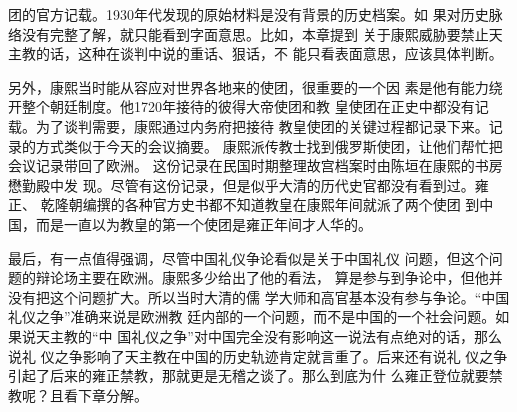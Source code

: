 团的官方记载。1930年代发现的原始材料是没有背景的历史档案。如%
果对历史脉络没有完整了解，就只能看到字面意思。比如，本章提到%
关于康熙威胁要禁止天主教的话，这种在谈判中说的重话、狠话，不%
能只看表面意思，应该具体判断。%
\par
另外，康熙当时能从容应对世界各地来的使团，很重要的一个因%
素是他有能力绕开整个朝廷制度。他1720年接待的彼得大帝使团和教%
皇使团在正史中都没有记载。为了谈判需要，康熙通过内务府把接待%
教皇使团的关键过程都记录下来。记录的方式类似于今天的会议摘要。%
康熙派传教士找到俄罗斯使团，让他们帮忙把会议记录带回了欧洲。%
这份记录在民国时期整理故宫档案时由陈垣在康熙的书房懋勤殿中发%
现。尽管有这份记录，但是似乎大清的历代史官都没有看到过。雍正、%
乾隆朝编撰的各种官方史书都不知道教皇在康熙年间就派了两个使团%
到中国，而是一直以为教皇的第一个使团是雍正年间才人华的。%
\par
最后，有一点值得强调，尽管中国礼仪争论看似是关于中国礼仪%
问题，但这个问题的辩论场主要在欧洲。康熙多少给出了他的看法，%
算是参与到争论中，但他并没有把这个问题扩大。所以当时大清的儒%
学大师和高官基本没有参与争论。“中国礼仪之争”准确来说是欧洲教%
廷内部的一个问题，而不是中国的一个社会问题。如果说天主教的“中%
国礼仪之争”对中国完全没有影响这一说法有点绝对的话，那么说礼%
仪之争影响了天主教在中国的历史轨迹肯定就言重了。后来还有说礼%
仪之争引起了后来的雍正禁教，那就更是无稽之谈了。那么到底为什%
么雍正登位就要禁教呢？且看下章分解。%
